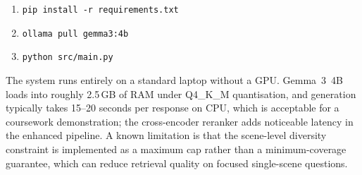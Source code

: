 \begin{enumerate}
  \item \texttt{pip install -r requirements.txt}
  \item \texttt{ollama pull gemma3:4b}
  \item \texttt{python src/main.py}
\end{enumerate}

The system runs entirely on a standard laptop without a GPU. Gemma~3~4B
loads into roughly 2.5\,GB of RAM under Q4\_K\_M quantisation, and
generation typically takes 15--20 seconds per response on CPU, which is
acceptable for a coursework demonstration; the cross-encoder reranker
adds noticeable latency in the enhanced pipeline. A known limitation is
that the scene-level diversity constraint is implemented as a maximum cap
rather than a minimum-coverage guarantee, which can reduce retrieval
quality on focused single-scene questions.

